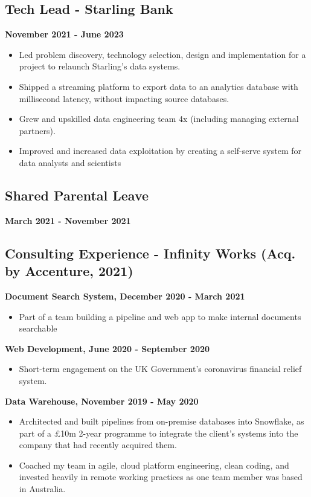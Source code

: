 \documentclass[a4paper]{scrartcl}
\begin{document}
\subsection*{Tech Lead - Starling Bank}
\textbf{November 2021 - June 2023}
\begin{itemize}
      \item Led problem discovery, technology selection, design and
            implementation for a project to relaunch Starling's data systems.
      \item Shipped a streaming platform to export data to an analytics
            database
            with millisecond latency, without impacting source databases.
      \item Grew and upskilled data engineering team 4x (including managing
            external partners).
      \item Improved and increased data exploitation by creating a self-serve
            system for data analysts and scientists
\end{itemize}

\subsection*{Shared Parental Leave}
\textbf{March 2021 - November 2021}

\subsection*{Consulting Experience - Infinity Works (Acq. by Accenture, 2021)}
\textbf{Document Search System, December 2020 - March 2021}
\begin{itemize}
      \item Part of a team building a pipeline and web app to make internal
            documents searchable
\end{itemize}

\textbf{Web Development, June 2020 - September 2020}
\begin{itemize}
      \item Short-term engagement on the UK Government's coronavirus financial
            relief system.
\end{itemize}

\textbf{Data Warehouse, November 2019 - May 2020}
\begin{itemize}
      \item Architected and built pipelines from on-premise databases into
            Snowflake, as part of a £10m 2-year programme to integrate the
            client's systems into the company that had recently acquired them.
      \item Coached my team in agile, cloud platform engineering, clean coding,
            and invested heavily in remote working practices as one team member
            was based
            in Australia.
\end{itemize}
\end{document}
